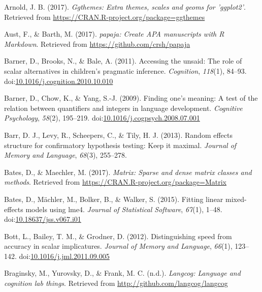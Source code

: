 \documentclass[mask,man]{apa6}
\theoremstyle{definition}
\theoremstyle{definition}
\theoremstyle{definition}
\theoremstyle{remark}
\begin{document}
\setlength{\parindent}{-0.5in} \setlength{\leftskip}{0.5in}

\hypertarget{refs}{}
\hypertarget{ref-R-ggthemes}{}
Arnold, J. B. (2017). \emph{Ggthemes: Extra themes, scales and geoms for
'ggplot2'}. Retrieved from
\url{https://CRAN.R-project.org/package=ggthemes}

\hypertarget{ref-R-papaja}{}
Aust, F., \& Barth, M. (2017). \emph{papaja: Create APA manuscripts with
R Markdown}. Retrieved from \url{https://github.com/crsh/papaja}

\hypertarget{ref-barner2011}{}
Barner, D., Brooks, N., \& Bale, A. (2011). Accessing the unsaid: The
role of scalar alternatives in children's pragmatic inference.
\emph{Cognition}, \emph{118}(1), 84--93.
doi:\href{https://doi.org/10.1016/j.cognition.2010.10.010}{10.1016/j.cognition.2010.10.010}

\hypertarget{ref-barner2009}{}
Barner, D., Chow, K., \& Yang, S.-J. (2009). Finding one's meaning: A
test of the relation between quantifiers and integers in language
development. \emph{Cognitive Psychology}, \emph{58}(2), 195--219.
doi:\href{https://doi.org/10.1016/j.cogpsych.2008.07.001}{10.1016/j.cogpsych.2008.07.001}

\hypertarget{ref-barr2013random}{}
Barr, D. J., Levy, R., Scheepers, C., \& Tily, H. J. (2013). Random
effects structure for confirmatory hypothesis testing: Keep it maximal.
\emph{Journal of Memory and Language}, \emph{68}(3), 255--278.

\hypertarget{ref-R-Matrix}{}
Bates, D., \& Maechler, M. (2017). \emph{Matrix: Sparse and dense matrix
classes and methods}. Retrieved from
\url{https://CRAN.R-project.org/package=Matrix}

\hypertarget{ref-R-lme4}{}
Bates, D., Mächler, M., Bolker, B., \& Walker, S. (2015). Fitting linear
mixed-effects models using lme4. \emph{Journal of Statistical Software},
\emph{67}(1), 1--48.
doi:\href{https://doi.org/10.18637/jss.v067.i01}{10.18637/jss.v067.i01}

\hypertarget{ref-bott2012}{}
Bott, L., Bailey, T. M., \& Grodner, D. (2012). Distinguishing speed
from accuracy in scalar implicatures. \emph{Journal of Memory and
Language}, \emph{66}(1), 123--142.
doi:\href{https://doi.org/10.1016/j.jml.2011.09.005}{10.1016/j.jml.2011.09.005}

\hypertarget{ref-R-langcog}{}
Braginsky, M., Yurovsky, D., \& Frank, M. C. (n.d.). \emph{Langcog:
Language and cognition lab things}. Retrieved from
\url{http://github.com/langcog/langcog}
\end{document}
